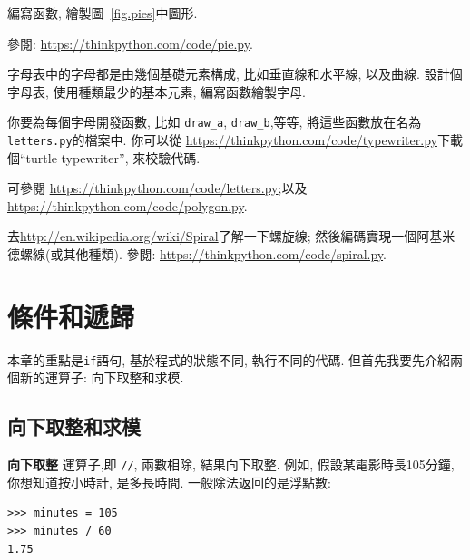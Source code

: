 \documentclass[10pt]{book}
\begin{document}
\begin{exercise}

編寫函數, 繪製圖~\ref{fig.pies}中圖形. 

參閱: \url{https://thinkpython.com/code/pie.py}.

\end{exercise}

\begin{exercise}

字母表中的字母都是由幾個基礎元素構成, 比如垂直線和水平線, 以及曲線. 
設計個字母表, 使用種類最少的基本元素, 編寫函數繪製字母. 

你要為每個字母開發函數, 比如 \verb"draw_a", \verb"draw_b",等等, 
將這些函數放在名為{\tt letters.py}的檔案中. 
你可以從 \url{https://thinkpython.com/code/typewriter.py}下載個``turtle typewriter'', 
來校驗代碼. 

可參閱 \url{https://thinkpython.com/code/letters.py};以及
\url{https://thinkpython.com/code/polygon.py}.

\end{exercise}

\begin{exercise}

去\url{http://en.wikipedia.org/wiki/Spiral}了解一下螺旋線;
然後編碼實現一個阿基米德螺線(或其他種類). 
參閱: \url{https://thinkpython.com/code/spiral.py}.

\end{exercise}


\chapter{條件和遞歸}

本章的重點是{\tt if}語句, 
基於程式的狀態不同, 執行不同的代碼. 
但首先我要先介紹兩個新的運算子: 向下取整和求模. 

\section{向下取整和求模}

{\bf 向下取整} 運算子,即 \verb"//", 
兩數相除, 結果向下取整. 
例如, 假設某電影時長105分鐘, 你想知道按小時計, 是多長時間. 
一般除法返回的是浮點數:

\begin{verbatim}
>>> minutes = 105
>>> minutes / 60
1.75
\end{verbatim}
\end{document}
